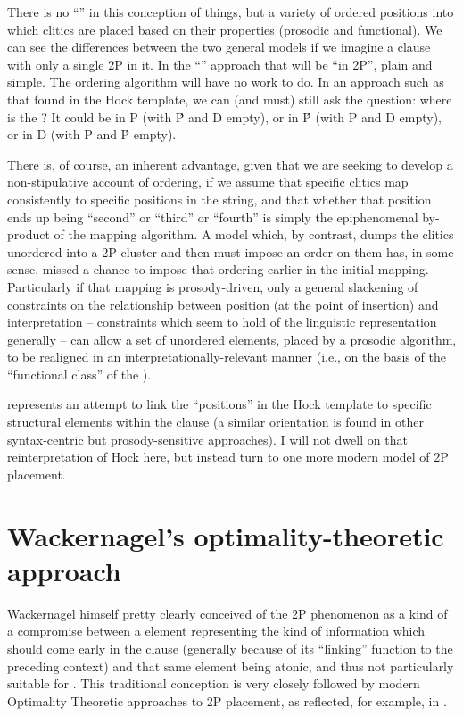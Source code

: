 \documentclass[output=paper,
modfonts
]{LSP/langsci}
\begin{document}
There is no ``'' in this conception of things, but a variety of ordered
positions into which clitics are placed based on their properties (prosodic and functional). We can
see the differences between the two general models if we imagine a clause with only a single 2P 
in it. In the ``'' approach that  will be ``in 2P'', plain and simple. The ordering
algorithm will have no work to do. In an approach such as that found in the Hock template, we can
(and must) still ask the question: where is the ? It could be in P (with \'{P} and D empty),
or in \'{P} (with P and D empty), or in D (with P and \'{P} empty).

There is, of course, an inherent advantage, given that we are seeking to develop a non-stipulative account
of ordering, if we assume that specific clitics map consistently to specific positions in the
string, and that whether that position ends up being ``second'' or ``third'' or ``fourth'' is simply
the epiphenomenal by-product of the mapping algorithm. A model which, by contrast, dumps the
clitics unordered into a 2P cluster and then must impose an order on them has, in some sense,
missed a chance to impose that ordering earlier in the initial mapping. Particularly if that
mapping is prosody-driven, only a general slackening of constraints on the relationship between
position (at the point of insertion) and interpretation -- constraints which seem to hold of the linguistic
representation generally -- can allow a set of unordered elements, placed by a prosodic algorithm,
to be realigned in an interpretationally-relevant manner (i.e., on the basis of the ``functional
class'' of the ).

\citet{hale1996} represents an attempt to link the ``positions'' in the Hock template
to specific structural elements within the clause (a similar orientation is found in other
syntax-centric but prosody-sensitive approaches). I will not dwell on that reinterpretation
of Hock here, but instead turn to one more modern model of 2P placement.

\section{Wackernagel's optimality-theoretic approach}
Wackernagel himself pretty clearly conceived of the 2P phenomenon as a kind of
a compromise between a  element representing the kind of information which should come
early in the clause (generally because of its ``linking'' function to the preceding context)
and that same element being atonic, and thus not particularly suitable for .
This traditional conception is very closely followed by modern Optimality Theoretic approaches
to 2P placement, as reflected, for example, in \citet{anderson2005}.
\end{document}
